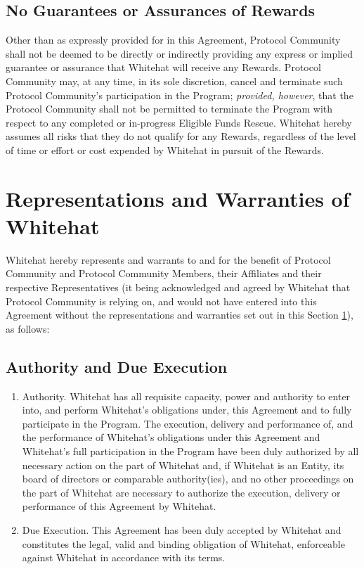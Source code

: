 \documentclass{article}
\begin{document}
\subsection{No Guarantees or Assurances of Rewards}\label{subsec:no_guarantees}

Other than as expressly provided for in this Agreement, Protocol Community shall not be deemed to be directly or indirectly providing any express or implied guarantee or assurance that Whitehat will receive any Rewards. Protocol Community may, at any time, in its sole discretion, cancel and terminate such Protocol Community's participation in the Program; \textit{provided, however}, that the Protocol Community shall not be permitted to terminate the Program with respect to any completed or in-progress Eligible Funds Rescue. Whitehat hereby assumes all risks that they do not qualify for any Rewards, regardless of the level of time or effort or cost expended by Whitehat in pursuit of the Rewards.

\section{Representations and Warranties of Whitehat}\label{sec:warranties}

Whitehat hereby represents and warrants to and for the benefit of Protocol Community and Protocol Community Members, their Affiliates and their respective Representatives (it being acknowledged and agreed by Whitehat that Protocol Community is relying on, and would not have entered into this Agreement without the representations and warranties set out in this Section \ref{sec:warranties}), as follows:

\subsection{Authority and Due Execution}\label{subsec:authority}

\begin{enumerate}
    \item Authority. Whitehat has all requisite capacity, power and authority to enter into, and perform Whitehat's obligations under, this Agreement and to fully participate in the Program. The execution, delivery and performance of, and the performance of Whitehat's obligations under this Agreement and Whitehat's full participation in the Program have been duly authorized by all necessary action on the part of Whitehat and, if Whitehat is an Entity, its board of directors or comparable authority(ies), and no other proceedings on the part of Whitehat are necessary to authorize the execution, delivery or performance of this Agreement by Whitehat.

    \item Due Execution. This Agreement has been duly accepted by Whitehat and constitutes the legal, valid and binding obligation of Whitehat, enforceable against Whitehat in accordance with its terms.

\end{enumerate}
\end{document}
